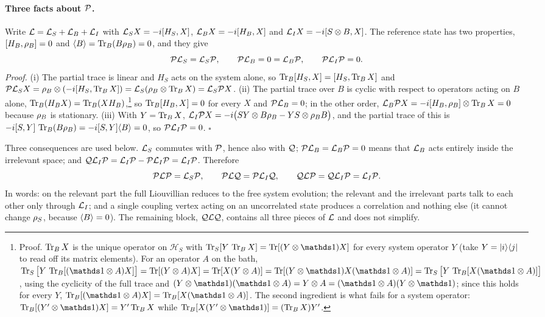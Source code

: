 \paragraph{Three facts about $\mathcal{P}$.}
Write $\mathcal{L}=\mathcal{L}_S+\mathcal{L}_B+\mathcal{L}_I$ with $\mathcal{L}_SX=-i[H_S,X]$, $\mathcal{L}_BX=-i[H_B,X]$ and $\mathcal{L}_IX=-i[S\otimes B,X]$.
The reference state has two properties, $[H_B,\rho_{B}]=0$ and $\langle B\rangle=\operatorname{Tr}_B(B\rho_{B})=0$, and they give
\begin{equation}
  \mathcal{P}\mathcal{L}_S=\mathcal{L}_S\mathcal{P},\qquad \mathcal{P}\mathcal{L}_B=0=\mathcal{L}_B\mathcal{P},\qquad \mathcal{P}\mathcal{L}_I\mathcal{P}=0 .
  \label{eq:P-facts}
\end{equation}
\emph{Proof.}
(i) The partial trace is linear and $H_S$ acts on the system alone, so $\operatorname{Tr}_B[H_S,X]=[H_S,\operatorname{Tr}_BX]$ and $\mathcal{P}\mathcal{L}_SX=\rho_{B}\otimes(-i[H_S,\operatorname{Tr}_BX])=\mathcal{L}_S(\rho_{B}\otimes\operatorname{Tr}_BX)=\mathcal{L}_S\mathcal{P} X$.
(ii) The partial trace over $B$ is cyclic with respect to operators acting on $B$ alone, $\operatorname{Tr}_B(H_BX)=\operatorname{Tr}_B(XH_B)$,\footnote{Proof.
$\operatorname{Tr}_BX$ is the unique operator on $\mathcal H_S$ with $\Tr_S[Y\,\Tr_BX]=\Tr[(Y\otimes\Id)X]$ for every system operator $Y$ (take $Y=|i\rangle\langle j|$ to read off its matrix elements).
For an operator $A$ on the bath, $\Tr_S\big[Y\,\Tr_B[(\Id\otimes A)X]\big]=\Tr[(Y\otimes A)X]=\Tr[X(Y\otimes A)]=\Tr[(Y\otimes\Id)X(\Id\otimes A)]=\Tr_S\big[Y\,\Tr_B[X(\Id\otimes A)]\big]$, using the cyclicity of the full trace and $(Y\otimes\Id)(\Id\otimes A)=Y\otimes A=(\Id\otimes A)(Y\otimes\Id)$; since this holds for every $Y$, $\Tr_B[(\Id\otimes A)X]=\Tr_B[X(\Id\otimes A)]$.
The second ingredient is what fails for a system operator: $\Tr_B[(Y'\otimes\Id)X]=Y'\Tr_BX$ while $\Tr_B[X(Y'\otimes\Id)]=(\Tr_BX)Y'$.} so $\operatorname{Tr}_B[H_B,X]=0$ for every $X$ and $\mathcal{P}\mathcal{L}_B=0$; in the other order, $\mathcal{L}_B\mathcal{P} X=-i[H_B,\rho_{B}]\otimes\operatorname{Tr}_BX=0$ because $\rho_{B}$ is stationary.
(iii) With $Y=\operatorname{Tr}_BX$, $\mathcal{L}_I\mathcal{P} X=-i\big(SY\otimes B\rho_{B}-YS\otimes\rho_{B} B\big)$, and the partial trace of this is $-i[S,Y]\,\operatorname{Tr}_B(B\rho_{B})=-i[S,Y]\langle B\rangle=0$, so $\mathcal{P}\mathcal{L}_I\mathcal{P}=0$.
$\square$

Three consequences are used below.
$\mathcal{L}_S$ commutes with $\mathcal{P}$, hence also with $\mathcal{Q}$; $\mathcal{P}\mathcal{L}_B=\mathcal{L}_B\mathcal{P}=0$ means that $\mathcal{L}_B$ acts entirely inside the irrelevant space; and $\mathcal{Q}\mathcal{L}_I\mathcal{P}=\mathcal{L}_I\mathcal{P}-\mathcal{P}\mathcal{L}_I\mathcal{P}=\mathcal{L}_I\mathcal{P}$.
Therefore
\begin{equation}
  \mathcal{P}\mathcal{L}\mathcal{P}=\mathcal{L}_S\mathcal{P},\qquad
  \mathcal{P}\mathcal{L}\mathcal{Q}=\mathcal{P}\mathcal{L}_I\mathcal{Q},\qquad
  \mathcal{Q}\mathcal{L}\mathcal{P}=\mathcal{Q}\mathcal{L}_I\mathcal{P}=\mathcal{L}_I\mathcal{P} .
  \label{eq:PLQ}
\end{equation}
In words: on the relevant part the full Liouvillian reduces to the free system evolution; the relevant and the irrelevant parts talk to each other only through $\mathcal{L}_I$; and a single coupling vertex acting on an uncorrelated state produces a correlation and nothing else (it cannot change $\rho_{S}$, because $\langle B\rangle=0$).
The remaining block, $\mathcal{Q}\mathcal{L}\mathcal{Q}$, contains all three pieces of $\mathcal{L}$ and does not simplify.

